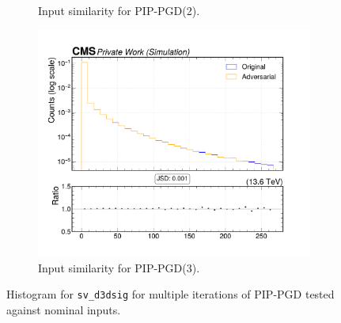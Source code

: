 \begin{figure}[htbp]
\begin{subfigure}[t]{0.32\textwidth}
    \caption*{Input similarity for PIP-PGD(2).}
  \end{subfigure}\hfill
  \begin{subfigure}[t]{0.32\textwidth}
    \includegraphics[width=\linewidth]{media/output/features/compare/combined_it_3/cmp_vtx_arr_sv_d3dsig.pdf}
    \caption*{Input similarity for PIP-PGD(3).}
  \end{subfigure}

  \caption*{Histogram for \texttt{sv\_d3dsig} for multiple iterations of PIP-PGD tested against nominal inputs.}
  \label{fig:combined_input_sv_d3dsig}
\end{figure}

